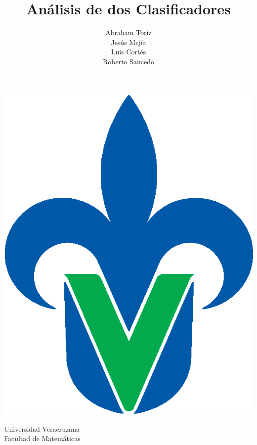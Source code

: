 \documentclass[11pt,letterpaper, reqno]{article}
\title{Análisis de dos Clasificadores}
\author{Abraham Toriz\\ Jesús Mejía\\ Luis Cortés\\ Roberto Saucedo}
\begin{document}
\pagestyle{empty}
\begin{minipage}{.15\textwidth}
	\includegraphics[scale=.22]{uv.eps}
\end{minipage}
\begin{minipage}{.7\textwidth}
\centering
{\huge \sc Universidad Veracruzana}\\
{\LARGE \sc Facultad de Matemáticas}
\end{minipage}
\end{document}
